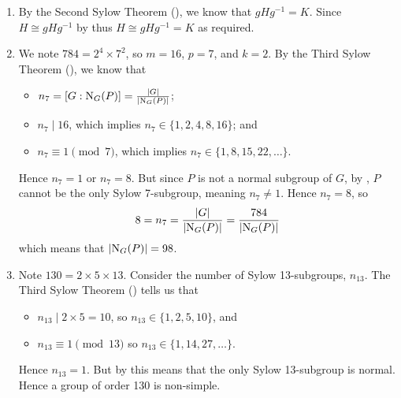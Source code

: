 \begin{enumerate}
    \item By the Second Sylow Theorem (), we know that $gHg^{-1} = K$. Since $H \cong gHg^{-1}$ by  thus $H \cong gHg^{-1} = K$ as required.

    \item We note $784 = 2^4 \times 7^2$, so $m = 16$, $p = 7$, and $k = 2$. By the Third Sylow Theorem (), we know that
    \begin{itemize}
        \item $n_7 = [G : \mathrm{N}_{G}(P)] = \frac{|G|}{|\mathrm{N}_{G}(P)|}$;
        \item $n_7 \mid 16$, which implies $n_7 \in \{1, 2, 4, 8, 16\}$; and
        \item $n_7 \equiv 1 \pmod 7$, which implies $n_7 \in \{1, 8, 15, 22, \dots\}$.
    \end{itemize}
    Hence $n_7 = 1$ or $n_7 = 8$. But since $P$ is not a normal subgroup of $G$, by , $P$ cannot be the only Sylow 7-subgroup, meaning $n_7 \neq 1$. Hence $n_7 = 8$, so
    \[
        8 = n_7 = \frac{|G|}{|\mathrm{N}_{G}(P)|} = \frac{784}{|\mathrm{N}_{G}(P)|}
    \]
    which means that $|\mathrm{N}_{G}(P)| = 98$.

    \item Note $130 = 2 \times 5 \times 13$. Consider the number of Sylow 13-subgroups, $n_{13}$. The Third Sylow Theorem () tells us that
    \begin{itemize}
        \item $n_{13} \mid 2 \times 5 = 10$, so $n_{13} \in \{1, 2, 5, 10\}$, and
        \item $n_{13} \equiv 1 \pmod{13}$ so $n_{13} \in \{1, 14, 27, \dots\}$.
    \end{itemize}
    Hence $n_{13} = 1$. But by  this means that the only Sylow 13-subgroup is normal. Hence a group of order 130 is non-simple.
\end{enumerate}

